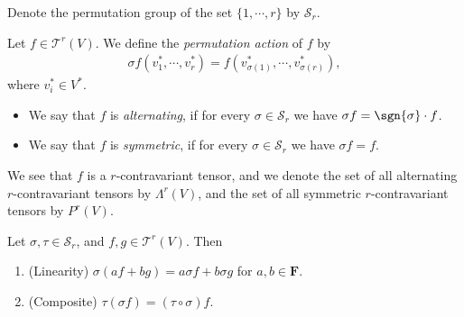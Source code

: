 Denote the permutation group of the set $\{1, \cdots, r\}$ by $\mathcal{S}_r$.

\begin{definition}
    Let $f \in \mathcal{T}^r(V)$. We define the \emph{permutation action} of $f$ by
    \begin{align*}
        \sigma f(v_1^*, \cdots, v_r^*)
        = f(v_{\sigma(1)}^*, \cdots, v_{\sigma(r)}^*),
    \end{align*}
    where $v_i^* \in V^*$.

    \begin{itemize}
        \item We say that $f$ is \emph{alternating}, if for every $\sigma \in \mathcal{S}_r$ we have $\sigma f = \sgn{\sigma} \cdot f$.
        \item We say that $f$ is \emph{symmetric}, if for every $\sigma \in \mathcal{S}_r$ we have $\sigma f = f$.
    \end{itemize}
    We see that $f$ is a $r$-contravariant tensor, and we denote the set of all alternating $r$-contravariant tensors by $\Lambda^r(V)$, and the set of all symmetric $r$-contravariant tensors by $P^r(V)$.
\end{definition}

\begin{lemma}\label{lem:property of permutation action}
    Let $\sigma, \tau \in \mathcal{S}_r$, and $f, g \in \mathcal{T}^r(V)$. Then
    \begin{enumerate}
        \item (Linearity) $\sigma(af + bg) = a\sigma f + b\sigma g$ for $a, b \in \mathbf{F}$.
        \item (Composite) $\tau(\sigma f) = (\tau \circ \sigma)f$.
    \end{enumerate}
\end{lemma}

